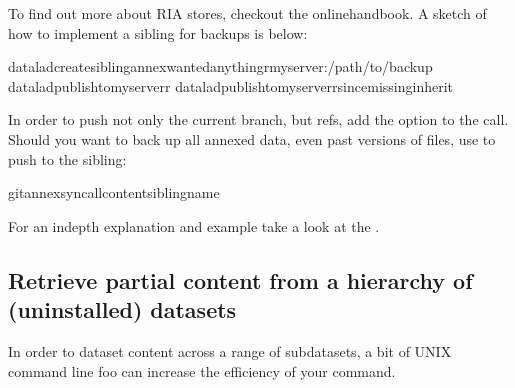 \sphinxAtStartPar
To find out more about RIA stores, checkout the online\sphinxhyphen{}handbook.
A sketch of how to implement a sibling for backups is below:

\begin{sphinxVerbatim}[commandchars=\\\{\}]
dataladcreate\PYGZhy{}sibling\PYGZhy{}\PYGZhy{}annex\PYGZhy{}wantedanything\PYGZhy{}rmyserver:/path/to/backup
dataladpublish\PYGZhy{}\PYGZhy{}tomyserver\PYGZhy{}r
dataladpublish\PYGZhy{}\PYGZhy{}tomyserver\PYGZhy{}r\PYGZhy{}\PYGZhy{}since\PYGZhy{}\PYGZhy{}missinginherit
\end{sphinxVerbatim}

\sphinxAtStartPar
In order to push not only the current branch, but refs, add the option
 to the  call.
Should you want to back up all annexed data, even past versions of files, use
 to push to the sibling:

\begin{sphinxVerbatim}[commandchars=\\\{\}]
gitannexsync\PYGZhy{}\PYGZhy{}all\PYGZhy{}\PYGZhy{}content\PYGZlt{}sibling\PYGZhy{}name\PYGZgt{}
\end{sphinxVerbatim}

\sphinxAtStartPar
For an in\sphinxhyphen{}depth explanation and example take a look at the
.


\subsection{Retrieve partial content from a hierarchy of (uninstalled) datasets}
\label{\detokenize{basics/101-146-gists:retrieve-partial-content-from-a-hierarchy-of-uninstalled-datasets}}\label{\detokenize{basics/101-146-gists:retrievehcp}}
\sphinxAtStartPar
In order to  dataset content across a range of subdatasets, a bit
of UNIX command line foo can increase the efficiency of your command.

